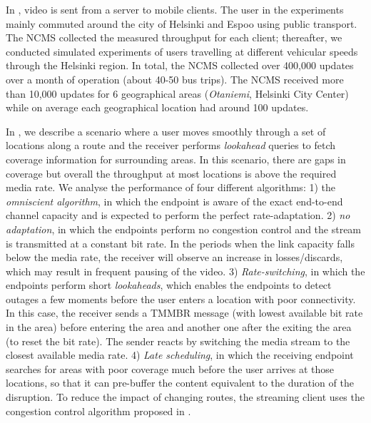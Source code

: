 In , video is sent from a server to mobile clients. The user
in the experiments mainly commuted around the city of Helsinki and Espoo using
public transport. The NCMS collected the measured throughput for each client;
thereafter, we conducted simulated experiments of users travelling at different
vehicular speeds through the Helsinki region. In total, the NCMS collected
over 400,000 updates over a month of operation (about 40-50 bus trips). The
NCMS received more than 10,000 updates for 6 geographical areas
(\emph{Otaniemi}, Helsinki City Center) while on average each geographical
location had around 100 updates.

In , we describe a scenario where a user moves smoothly
through a set of locations along a route and the receiver performs
\emph{lookahead} queries to fetch coverage information for surrounding areas.
In this scenario, there are gaps in coverage but overall the throughput at
most locations is above the required media rate. We analyse the performance of
four different algorithms: 1) the \emph{omniscient algorithm}, in which the
endpoint is aware of the exact end-to-end channel capacity and is expected to
perform the perfect rate-adaptation. 2) \emph{no adaptation}, in which the endpoints
perform no congestion control and the stream is transmitted at a constant bit
rate. In the periods when the link capacity falls below the media rate, the
receiver will observe an increase in losses/discards, which may result in
frequent pausing of the video. 3) \emph{Rate-switching}, in which the endpoints perform short
\emph{lookaheads}, which enables the endpoints to detect outages a few moments
before the user enters a location with poor connectivity. In this case, the
receiver sends a TMMBR message (with lowest available bit rate in the area)
before entering the area and another one after the exiting the area (to reset
the bit rate). The sender reacts by switching the media stream to the closest
available media rate. 4) \emph{Late scheduling}, in which the receiving endpoint
searches for areas with poor coverage much before the user arrives at those
locations, so that it can pre-buffer the content equivalent to the duration of
the disruption. To reduce the impact of changing routes, the streaming client
uses the congestion control algorithm proposed in .

